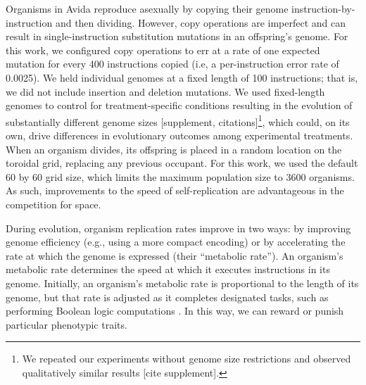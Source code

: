 

Organisms in Avida reproduce asexually by copying their genome instruction-by-instruction and then dividing. 
However, copy operations are imperfect and can result in single-instruction substitution mutations in an offspring's genome. 
For this work, we configured copy operations to err at a rate of one expected mutation for every 400 instructions copied (i.e, a per-instruction error rate of 0.0025).
We held individual genomes at a fixed length of 100 instructions; that is, we did not include insertion and deletion mutations. 
We used fixed-length genomes to control for treatment-specific conditions resulting in the evolution of substantially different genome sizes [supplement, citations]\footnote{We repeated our experiments without genome size restrictions and observed qualitatively similar results [cite supplement].}, which could, on its own, drive differences in evolutionary outcomes among experimental treatments.
When an organism divides, its offspring is placed in a random location on the toroidal grid, replacing any previous occupant.
For this work, we used the default 60 by 60 grid size, which limits the maximum population size to 3600 organisms.
As such, improvements to the speed of self-replication are advantageous in the competition for space.


During evolution, organism replication rates improve in two ways: by improving genome efficiency (e.g., using a more compact encoding) or by accelerating the rate at which the genome is expressed (their ``metabolic rate'').
An organism's metabolic rate determines the speed at which it executes instructions in its genome.
Initially, an organism's metabolic rate is proportional to the length of its genome, but that rate is adjusted as it completes designated tasks, such as performing Boolean logic computations \citep{ofria_avida:_2009}.
In this way, we can reward or punish particular phenotypic traits. 

\vspace{1cm}
